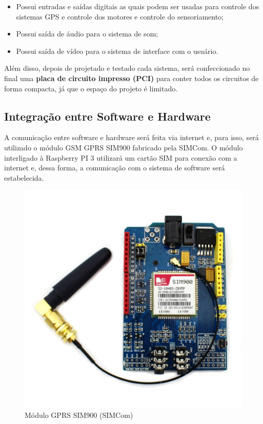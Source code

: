 \begin{itemize}
  \item Possui entradas e saídas digitais as quais podem ser usadas para controle dos sistemas GPS e controle dos motores e controle do sensoriamento;
  \item Possui saída de áudio para o sistema de som; 
  \item Possui saída de vídeo para o sistema de interface com o usuário.
\end{itemize}

Além disso, depois de projetado e testado cada sistema, será confeccionado no final uma \textbf{placa de circuito impresso (PCI)} para conter todos os circuitos de forma compacta, já que o espaço do projeto é limitado.

\subsection{Integração entre Software e Hardware}
A comunicação entre software e hardware será feita via internet e, para isso, será utilizado o módulo GSM GPRS SIM900 fabricado pela SIMCom. O módulo interligado à Raspberry PI 3 utilizará um cartão SIM para conexão com a internet e, dessa forma, a comunicação com o sistema de software será estabelecida.

\begin{figure}[H]
	\centering
    \includegraphics[scale=0.25]{figuras/modulo_gprs}
    \caption{Módulo GPRS SIM900 (SIMCom)}
    \label{fig:modulo_gprs}
\end{figure}

